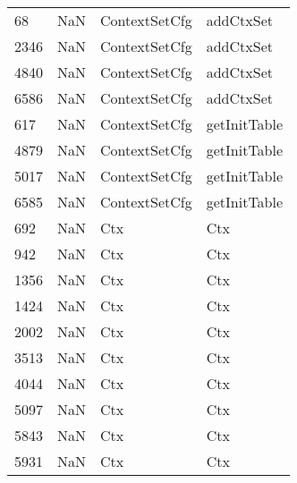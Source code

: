\begin{tabular}{llll}
68   &                   NaN &              ContextSetCfg &                                 addCtxSet \\
2346 &                   NaN &              ContextSetCfg &                                 addCtxSet \\
4840 &                   NaN &              ContextSetCfg &                                 addCtxSet \\
6586 &                   NaN &              ContextSetCfg &                                 addCtxSet \\
617  &                   NaN &              ContextSetCfg &                              getInitTable \\
4879 &                   NaN &              ContextSetCfg &                              getInitTable \\
5017 &                   NaN &              ContextSetCfg &                              getInitTable \\
6585 &                   NaN &              ContextSetCfg &                              getInitTable \\
692  &                   NaN &                        Ctx &                                       Ctx \\
942  &                   NaN &                        Ctx &                                       Ctx \\
1356 &                   NaN &                        Ctx &                                       Ctx \\
1424 &                   NaN &                        Ctx &                                       Ctx \\
2002 &                   NaN &                        Ctx &                                       Ctx \\
3513 &                   NaN &                        Ctx &                                       Ctx \\
4044 &                   NaN &                        Ctx &                                       Ctx \\
5097 &                   NaN &                        Ctx &                                       Ctx \\
5843 &                   NaN &                        Ctx &                                       Ctx \\
5931 &                   NaN &                        Ctx &                                       Ctx \\

\end{tabular}
